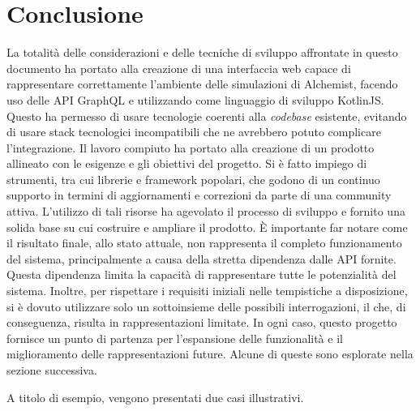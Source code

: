 \chapter{Conclusione}
La totalità delle considerazioni e delle tecniche di sviluppo affrontate in questo documento ha portato alla creazione di una interfaccia web capace di rappresentare correttamente l'ambiente delle simulazioni di Alchemist, facendo uso delle \ac{API} GraphQL e utilizzando come linguaggio di sviluppo KotlinJS. Questo ha permesso di usare tecnologie coerenti alla \textit{codebase} esistente, evitando di usare stack tecnologici incompatibili che ne avrebbero potuto complicare l'integrazione. Il lavoro compiuto ha portato alla creazione di un prodotto allineato con le esigenze e gli obiettivi del progetto. 
Si è fatto impiego di strumenti, tra cui librerie e framework popolari, che godono di un continuo supporto in termini di aggiornamenti e correzioni da parte di una community attiva. L'utilizzo di tali risorse ha agevolato il processo di sviluppo e fornito una solida base su cui costruire e ampliare il prodotto.
È importante far notare come il risultato finale, allo stato attuale, non rappresenta il completo funzionamento del sistema, principalmente a causa della stretta dipendenza dalle \ac{API} fornite. Questa dipendenza limita la capacità di rappresentare tutte le potenzialità del sistema. Inoltre, per rispettare i requisiti iniziali nelle tempistiche a disposizione, si è dovuto utilizzare solo un sottoinsieme delle possibili interrogazioni, il che, di conseguenza, risulta in rappresentazioni limitate. In ogni caso, questo progetto fornisce un punto di partenza per l'espansione delle funzionalità e il miglioramento delle rappresentazioni future. Alcune di queste sono esplorate nella sezione successiva.

A titolo di esempio, vengono presentati due casi illustrativi.

